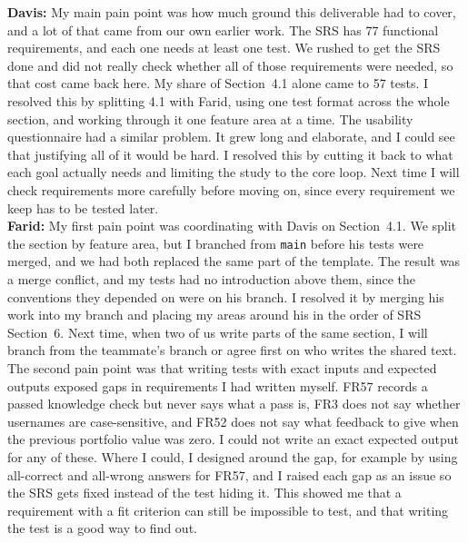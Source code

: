\documentclass[12pt, titlepage]{article}
\begin{document}
\noindent\textbf{Davis:} My main pain point was how much ground this deliverable
had to cover, and a lot of that came from our own earlier work. The SRS has 77
functional requirements, and each one needs at least one test. We rushed to get
the SRS done and did not really check whether all of those requirements were
needed, so that cost came back here. My share of Section~4.1 alone came to 57
tests. I resolved this by splitting 4.1 with Farid, using one test format across
the whole section, and working through it one feature area at a time. The
usability questionnaire had a similar problem. It grew long and elaborate, and I
could see that justifying all of it would be hard. I resolved this by cutting it
back to what each goal actually needs and limiting the study to the core loop.
Next time I will check requirements more carefully before moving on, since every
requirement we keep has to be tested later.\\

\noindent\textbf{Farid:} My first pain point was coordinating with Davis on
Section~4.1. We split the section by feature area, but I branched from
\texttt{main} before his tests were merged, and we had both replaced the same
part of the template. The result was a merge conflict, and my tests had no
introduction above them, since the conventions they depended on were on his
branch. I resolved it by merging his work into my branch and placing my areas
around his in the order of SRS Section~6. Next time, when two of us write
parts of the same section, I will branch from the teammate's branch or agree
first on who writes the shared text. The second pain point was that writing
tests with exact inputs and expected outputs exposed gaps in requirements I
had written myself. FR57 records a passed knowledge check but never says what
a pass is, FR3 does not say whether usernames are case-sensitive, and FR52
does not say what feedback to give when the previous portfolio value was zero.
I could not write an exact expected output for any of these. Where I could, I
designed around the gap, for example by using all-correct and all-wrong
answers for FR57, and I raised each gap as an issue so the SRS gets fixed
instead of the test hiding it. This showed me that a requirement with a fit
criterion can still be impossible to test, and that writing the test is a
good way to find out.\\
\end{document}
